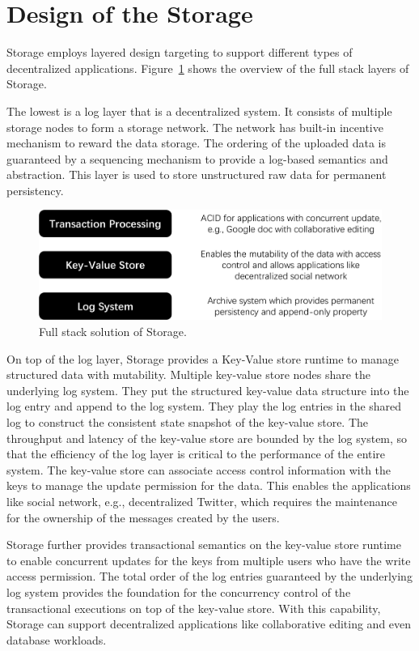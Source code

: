 \section{Design of the \projabbrev Storage}


\projabbrev Storage employs layered design targeting to support different types of decentralized applications. Figure~\ref{fig:stack} shows the overview of the full stack layers of \projabbrev Storage. 

The lowest is a log layer that is a decentralized system. It consists of multiple storage nodes to form a storage network. The network has built-in incentive mechanism to reward the data storage. The ordering of the uploaded data is guaranteed by a sequencing mechanism to provide a log-based semantics and abstraction. This layer is used to store unstructured raw data for permanent persistency.

\begin{figure}[H]	
	\includegraphics[width=\textwidth]{figure/stack-crop.pdf}
	\caption{Full stack solution of \projabbrev Storage.}
	\label{fig:stack}
\end{figure}

On top of the log layer, \projabbrev Storage provides a Key-Value store runtime to manage structured data with mutability. Multiple key-value store nodes share the underlying log system. They put the structured key-value data structure into the log entry and append to the log system. They play the log entries in the shared log to construct the consistent state snapshot of the key-value store. The throughput and latency of the key-value store are bounded by the log system, so that the efficiency of the log layer is critical to the performance of the entire system. The key-value store can associate access control information with the keys to manage the update permission for the data. This enables the applications like social network, e.g., decentralized Twitter, which requires the maintenance for the ownership of the messages created by the users. 

\projabbrev Storage further provides transactional semantics on the key-value store runtime to enable concurrent updates for the keys from multiple users who have the write access permission. The total order of the log entries guaranteed by the underlying log system provides the foundation for the concurrency control of the transactional executions on top of the key-value store. With this capability, \projabbrev Storage can support decentralized applications like collaborative editing and even database workloads.    
